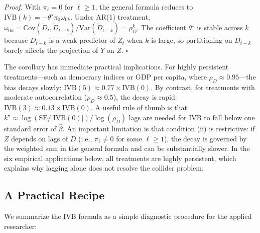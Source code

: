 \documentclass[
]{article}
\begin{document}
\noindent \textit{Proof.} With \(\pi_\ell = 0\) for \(\ell \geq 1\), the
general formula reduces to
\(\text{IVB}(k) = -\theta^{\star} \pi_0 \omega_{0k}\). Under AR(1)
treatment,
\(\omega_{0k} = \text{Cov}(\widetilde{D}_t, \widetilde{D}_{t-k}) / \text{Var}(\widetilde{D}_{t-k}) = \rho_D^k\).
The coefficient \(\theta^{\star}\) is stable across \(k\) because
\(D_{t-k}\) is a weak predictor of \(Z_t\) when \(k\) is large, so
partitioning on \(D_{t-k}\) barely affects the projection of \(Y\) on
\(Z\). \hfill \(\square\)

The corollary has immediate practical implications. For highly
persistent treatments---such as democracy indices or GDP per capita,
where \(\rho_D \approx 0.95\)---the bias decays slowly:
\(\text{IVB}(5) \approx 0.77 \times \text{IVB}(0)\). By contrast, for
treatments with moderate autocorrelation (\(\rho_D \approx 0.5\)), the
decay is rapid: \(\text{IVB}(3) \approx 0.13 \times \text{IVB}(0)\). A
useful rule of thumb is that
\(k^{\star} \approx \log(\text{SE}/|\text{IVB}(0)|) / \log(\rho_D)\)
lags are needed for IVB to fall below one standard error of
\(\hat{\beta}\). An important limitation is that condition (ii) is
restrictive: if \(Z\) depends on lags of \(D\) (i.e.,
\(\pi_\ell \neq 0\) for some \(\ell \geq 1\)), the decay is governed by
the weighted sum in the general formula and can be substantially slower.
In the six empirical applications below, all treatments are highly
persistent, which explains why lagging alone does not resolve the
collider problem.

\subsection{\texorpdfstring{A Practical Recipe
\label{sec:recipe}}{A Practical Recipe }}\label{a-practical-recipe}

We summarize the IVB formula as a simple diagnostic procedure for the
applied researcher:
\end{document}
